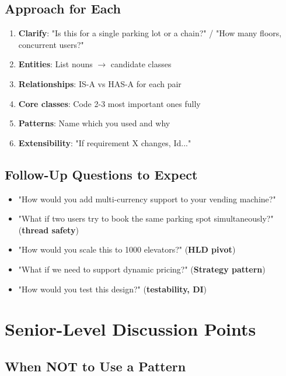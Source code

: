 \documentclass[11pt]{article}
\providecommand{\tightlist}{\setlength{\itemsep}{1pt}\setlength{\parskip}{0pt}}
\begin{document}
\subsection{Approach for Each}\label{approach-for-each}

\begin{enumerate}
\def\labelenumi{\arabic{enumi}.}
\tightlist
\item
  \textbf{Clarify}: "Is this for a single parking lot or a chain?" / "How many floors, concurrent users?"
\item
  \textbf{Entities}: List nouns \(\rightarrow\) candidate classes
\item
  \textbf{Relationships}: IS-A vs HAS-A for each pair
\item
  \textbf{Core classes}: Code 2-3 most important ones fully
\item
  \textbf{Patterns}: Name which you used and why
\item
  \textbf{Extensibility}: "If requirement X changes, I\textquotesingle d..."
\end{enumerate}

\subsection{Follow-Up Questions to Expect}\label{follow-up-questions-to-expect}

\begin{itemize}
\tightlist
\item
  "How would you add multi-currency support to your vending machine?"
\item
  "What if two users try to book the same parking spot simultaneously?" (\textbf{thread safety})
\item
  "How would you scale this to 1000 elevators?" (\textbf{HLD pivot})
\item
  "What if we need to support dynamic pricing?" (\textbf{Strategy pattern})
\item
  "How would you test this design?" (\textbf{testability, DI})
\end{itemize}

\section{Senior-Level Discussion Points}\label{senior-level-discussion-points}

\subsection{When NOT to Use a Pattern}\label{when-not-to-use-a-pattern}
\end{document}
